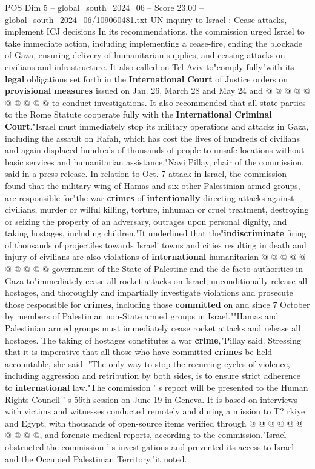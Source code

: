 \begin{textsample}{POS Dim 5 – global\_south\_2024\_06 – Score 23.00 – global\_south\_2024\_06/109060481.txt}
UN inquiry to Israel : Cease attacks, implement ICJ decisions In its recommendations, the commission urged Israel to take immediate action, including implementing a cease-fire, ending the blockade of Gaza, ensuring delivery of humanitarian supplies, and ceasing attacks on civilians and infrastructure.
It also called on Tel Aviv to"comply fully"with its \textbf{legal} obligations set forth in the \textbf{International} \textbf{Court} of Justice orders on \textbf{provisional} \textbf{measures} issued on Jan. 26, March 28 and May 24 and @ @ @ @ @ @ @ @ @ @ to conduct investigations.
It also recommended that all state parties to the Rome Statute cooperate fully with the \textbf{International} \textbf{Criminal} \textbf{Court}."Israel must immediately stop its military operations and attacks in Gaza, including the assault on Rafah, which has cost the lives of hundreds of civilians and again displaced hundreds of thousands of people to unsafe locations without basic services and humanitarian assistance,"Navi Pillay, chair of the commission, said in a press release.
In relation to Oct. 7 attack in Israel, the commission found that the military wing of Hamas and six other Palestinian armed groups, are responsible for"the war \textbf{crimes} of \textbf{intentionally} directing attacks against civilians, murder or wilful killing, torture, inhuman or cruel treatment, destroying or seizing the property of an adversary, outrages upon personal dignity, and taking hostages, including children."It underlined that the"\textbf{indiscriminate} firing of thousands of projectiles towards Israeli towns and cities resulting in death and injury of civilians are also violations of \textbf{international} humanitarian @ @ @ @ @ @ @ @ @ @ government of the State of Palestine and the de-facto authorities in Gaza to"immediately cease all rocket attacks on Israel, unconditionally release all hostages, and thoroughly and impartially investigate violations and prosecute those responsible for \textbf{crimes}, including those \textbf{committed} on and since 7 October by members of Palestinian non-State armed groups in Israel.""Hamas and Palestinian armed groups must immediately cease rocket attacks and release all hostages.
The taking of hostages constitutes a war \textbf{crime},"Pillay said.
Stressing that it is imperative that all those who have committed \textbf{crimes} be held accountable, she said :"The only way to stop the recurring cycles of violence, including aggression and retribution by both sides, is to ensure strict adherence to \textbf{international} law."The commission ' s report will be presented to the Human Rights Council ' s 56th session on June 19 in Geneva.
It is based on interviews with victims and witnesses conducted remotely and during a mission to T? rkiye and Egypt, with thousands of open-source items verified through @ @ @ @ @ @ @ @ @ @, and forensic medical reports, according to the commission."Israel obstructed the commission ' s investigations and prevented its access to Israel and the Occupied Palestinian Territory,"it noted.


\end{textsample}
